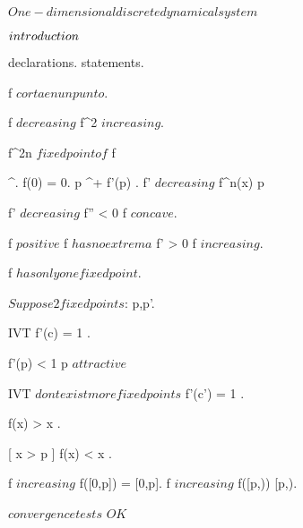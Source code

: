 \documentclass[../Main/main]{subfiles}
\begin{document}
\unit{ $ One-dimensional discrete dynamical system $ }
{
	\introduction
	{ 
		$introduction\\$ 
	}

	{
		{
			declarations.
		}
		\showthat
		{
			statements.
		}
		\demonstration
		{
			f $ corta en un punto $.

			f $ decreasing $ \imp f^2 $ increasing $.

			f^{2n} \convergesto $ fixed point of $ f
		}
	}
	
	
	{
		{
			 \in \C^{\infty}.
			f(0) = 0.
			p \in \R^+ \nonzero \suchthat f'(p) \geq 0.
			f' $ decreasing $
		}
		\showthat
		{
			\all{ p \in \R^+ \nonzero }
			{
				f^n(x) \convergesto p
			}
		}
		\demonstration
		{
			f' $ decreasing $ \imp f'' < 0 \imp f $ concave $.

			f $ positive $ \imp f $ has no extrema $ \imp f' > 0 \imp f $ increasing $.


			f $ has only one fixed point $.

			$Suppose 2 fixed points $: p,p'.

			IVT \imp \ex{ c \in (0,p') }
			{
				f'(c) = 1
			}.

			f'(p) < 1 \imp p $ attractive $

			IVT \imp $ dont exist more fixed points $ \imp f'(c') = 1 \nleq 1.

			\all{ x \in (0,p) }
			{
				f(x) > x
			}.

			{
				f(x) < x
			}.

			f $ increasing $ \imp f([0,p]) = [0,p].
			f $ increasing $ \imp f([p,\infty)) \subset [p,\infty).

			$ convergence tests $ \imp $OK$
		}
	}

}
\end{document}
